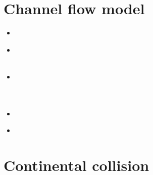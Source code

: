 \section{Channel flow model} 

\begin{scriptsize}
\begin{itemize}
\item[\twothousand] 
\textcite{clro00} \\
\item[\twothousandfour] 
\textcite{bejn04} \\
\textcite{jabm04} \\
\item[\twothousandsix] 
\textcite{jabn06} \\
\textcite{mebe06} \\
\textcite{benj06} \\
\item[\twothousandseven] 
\textcite{jabn07} \\
\item[\twothousandeleven] 
\textcite{jabe11} \\
\end{itemize}
\end{scriptsize}

\section*{Continental collision} 

